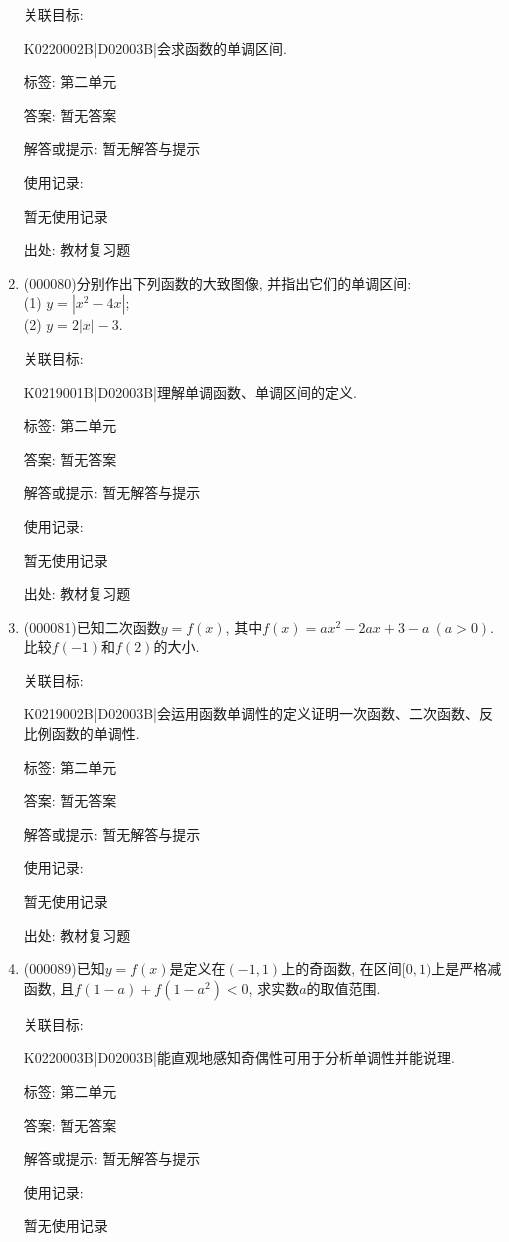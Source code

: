 \documentclass[10pt,a4paper]{article}
\begin{document}
\begin{enumerate}[1.]
关联目标:

K0220002B|D02003B|会求函数的单调区间.



标签: 第二单元

答案: 暂无答案

解答或提示: 暂无解答与提示

使用记录:

暂无使用记录


出处: 教材复习题
\item { (000080)}分别作出下列函数的大致图像, 并指出它们的单调区间:\\
(1) $y=|x^2-4x|$;\\
(2) $y=2|x|-3$.


关联目标:

K0219001B|D02003B|理解单调函数、单调区间的定义.



标签: 第二单元

答案: 暂无答案

解答或提示: 暂无解答与提示

使用记录:

暂无使用记录


出处: 教材复习题
\item { (000081)}已知二次函数$y=f(x)$, 其中$f(x)=ax^2-2ax+3-a \ (a>0)$. 比较$f(-1)$和$f(2)$的大小.


关联目标:

K0219002B|D02003B|会运用函数单调性的定义证明一次函数、二次函数、反比例函数的单调性.



标签: 第二单元

答案: 暂无答案

解答或提示: 暂无解答与提示

使用记录:

暂无使用记录


出处: 教材复习题
\item { (000089)}已知$y=f(x)$是定义在$(-1, 1)$上的奇函数, 在区间$[0, 1)$上是严格减函数, 且$f(1-a)+f(1-a^2)<0$, 求实数$a$的取值范围.


关联目标:

K0220003B|D02003B|能直观地感知奇偶性可用于分析单调性并能说理.



标签: 第二单元

答案: 暂无答案

解答或提示: 暂无解答与提示

使用记录:

暂无使用记录



\end{enumerate}
\end{document}
